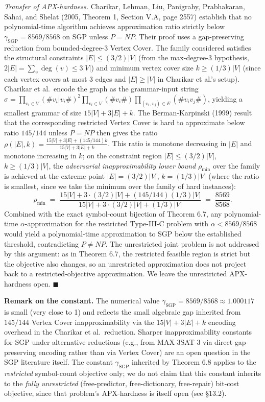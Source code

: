 \documentclass[
]{article}
\begin{document}
\emph{Transfer of APX-hardness.} Charikar, Lehman, Liu, Panigrahy,
Prabhakaran, Sahai, and Shelat (2005, Theorem 1, Section V.A,
page 2557) establish that no polynomial-time algorithm achieves
approximation ratio strictly below
$\gamma_{\mathrm{SGP}} = 8569/8568$ on SGP unless $P = NP$. Their
proof uses a gap-preserving reduction from bounded-degree-3 Vertex
Cover. The family considered satisfies the structural constraints
$|E| \leq (3/2)|V|$ (from the max-degree-3 hypothesis,
$2|E| = \sum_v \deg(v) \leq 3|V|$) and minimum vertex cover size
$k \geq (1/3)|V|$ (since each vertex covers at most 3 edges and
$|E| \geq |V|$ in Charikar et al.'s setup). Charikar et al.\
encode the graph as the grammar-input string
$\sigma = \prod_{v_i \in V}(\#v_i | v_i\#)^2 \prod_{v_i \in V}(\#v_i\#) \prod_{(v_i, v_j) \in E}(\#v_i v_j\#)$,
yielding a smallest grammar of size $15|V| + 3|E| + k$. The
Berman-Karpinski (1999) result that the corresponding restricted
Vertex Cover is hard to approximate below ratio $145/144$ unless
$P = NP$ then gives the ratio
$\rho(|E|, k) = \frac{15|V| + 3|E| + (145/144)k}{15|V| + 3|E| + k}$.
This ratio is monotone decreasing in $|E|$ and monotone increasing
in $k$; on the constraint region $|E| \leq (3/2)|V|$, $k \geq
(1/3)|V|$, the \emph{adversarial inapproximability lower bound}
$\rho_{\min}$ over the family is achieved at the extreme point
$|E| = (3/2)|V|$, $k = (1/3)|V|$ (where the ratio is smallest, since
we take the minimum over the family of hard instances):
\[
\rho_{\min} \;=\; \frac{15|V| + 3 \cdot (3/2)|V| + (145/144)(1/3)|V|}{15|V| + 3 \cdot (3/2)|V| + (1/3)|V|}
\;=\; \frac{8569}{8568}.
\]
Combined with the exact symbol-count bijection of Theorem 6.7, any
polynomial-time $\alpha$-approximation for the restricted
Type-III-C problem with $\alpha < 8569/8568$ would yield a
polynomial-time approximation to SGP below the established
threshold, contradicting $P \neq NP$. The unrestricted joint
problem is not addressed by this argument: as in Theorem 6.7, the
restricted feasible region is strict but the objective also
changes, so an unrestricted approximation does not project back to
a restricted-objective approximation. We leave the unrestricted
APX-hardness open. \hfill$\blacksquare$

\textbf{Remark on the constant.} The numerical value
$\gamma_{\mathrm{SGP}} = 8569/8568 \approx 1.000117$ is small (very
close to 1) and reflects the small algebraic gap inherited from
$145/144$ Vertex Cover inapproximability via the
$15|V| + 3|E| + k$ encoding overhead in the Charikar et al.\
reduction. Sharper inapproximability constants for SGP under
alternative reductions (e.g., from MAX-3SAT-3 via direct
gap-preserving encoding rather than via Vertex Cover) are an open
question in the SGP literature itself. The constant
$\gamma_{\mathrm{SGP}}$ inherited by Theorem 6.8 applies to the
\emph{restricted} symbol-count objective only; we do not claim
that this constant inherits to the \emph{fully unrestricted}
(free-predictor, free-dictionary, free-repair) bit-cost objective,
since that problem's APX-hardness is itself open (see §13.2).
\end{document}
